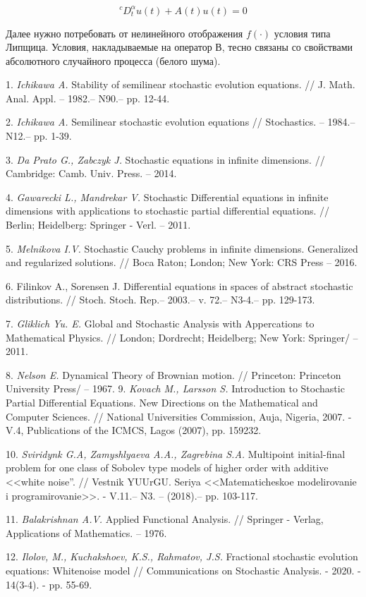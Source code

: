 $$^{c}D_{t}^{\alpha}u(t)+A(t)u(t)=0$$

Далее нужно потребовать от нелинейного отображения $f(\cdot)$ условия типа Липщица. Условия, накладываемые на оператор $В$, тесно связаны со свойствами абсолютного случайного процесса (белого шума).









\litlist

1.	{\it Ichikawa A.} Stability of semilinear stochastic evolution equations. // J. Math. Anal. Appl. – 1982.– N90.– pp. 12-44.

2.	{\it Ichikawa A.} Semilinear stochastic evolution equations // Stochastics. – 1984.– N12.– pp. 1-39.

3.	{\it Da Prato G., Zabczyk J.} Stochastic equations in infinite dimensions. // Cambridge: Camb. Univ. Press. – 2014.

4.	{\it Gawarecki L., Mandrekar V.} Stochastic Differential equations in infinite dimensions with applications to stochastic partial differential equations. // Berlin; Heidelberg: Springer - Verl. – 2011.

5.	{\it Melnikova I.V.} Stochastic Cauchy problems in infinite dimensions. Generalized and regularized solutions. // Boca Raton; London; New York: CRS Press – 2016.

6.	{Filinkov A., Sorensen J.}  Differential equations in spaces of abstract stochastic distributions. // Stoch. Stoch. Rep.– 2003.– v. 72.– N3-4.– pp. 129-173.

7.	{\it Gliklich Yu. E.} Global and Stochastic Analysis with Appercations to Mathematical Physics. // London; Dordrecht; Heidelberg; New York: Springer/ – 2011.

8.	{\it Nelson E.} Dynamical Theory of Brownian motion. // Princeton: Princeton University Press/ – 1967.
9.	{\it Kovach M., Larsson S.} Introduction to Stochastic Partial Differential Equations. New Directions on the Mathematical and Computer Sciences. // National Universities Commission, Auja, Nigeria, 2007. -V.4, Publications of the ICMCS, Lagos (2007), pp. 159232.

10.	{\it Sviridynk G.A, Zamyshlyaeva A.A., Zagrebina S.A.} Multipoint initial-final problem for one class of Sobolev type models of higher order with additive <<white noise”. // Vestnik YUUrGU. Seriya <<Matematicheskoe modelirovanie i programirovanie>>. - V.11.– N3. – (2018).– pp. 103-117.

11.	{\it Balakrishnan A.V.} Applied Functional Analysis. // Springer - Verlag, Applications of Mathematics. – 1976.

12. {\it Ilolov, M., Kuchakshoev, K.S., Rahmatov, J.S.} Fractional stochastic evolution equations: Whitenoise model // Communications on Stochastic Analysis. - 2020. - 14(3-4). - pp. 55-69.


